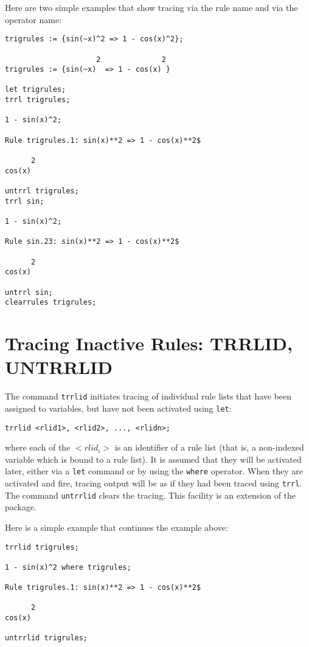 Here are two simple examples that show tracing via the rule name and
via the operator name:
\begin{verbatim}
trigrules := {sin(~x)^2 => 1 - cos(x)^2};

                     2              2
trigrules := {sin(~x)  => 1 - cos(x) }

let trigrules;
trrl trigrules;

1 - sin(x)^2;

Rule trigrules.1: sin(x)**2 => 1 - cos(x)**2$

      2
cos(x)

untrrl trigrules;
trrl sin;

1 - sin(x)^2;

Rule sin.23: sin(x)**2 => 1 - cos(x)**2$

      2
cos(x)

untrrl sin;
clearrules trigrules;
\end{verbatim}

\section{Tracing Inactive Rules: TRRLID, UNTRRLID}

\hypertarget{command:TRRLID}{}
\hypertarget{command:UNTRRLID}{}
The command \texttt{trrlid} initiates tracing of individual rule lists
that have been assigned to variables, but have not been activated
using \texttt{let}:
\begin{verbatim}
trrlid <rlid1>, <rlid2>, ..., <rlidn>;
\end{verbatim}
where each of the $<rlid_i>$ is an identifier of a rule list (that is,
a non-indexed variable which is bound to a rule list).  It is assumed
that they will be activated later, either via a \texttt{let} command
or by using the \texttt{where} operator.  When they are activated and
fire, tracing output will be as if they had been traced using
\texttt{trrl}.  The command \texttt{untrrlid} clears the tracing.
This facility is an extension of the \rdebug{} package.

Here is a simple example that continues the example above:
\begin{verbatim}
trrlid trigrules;

1 - sin(x)^2 where trigrules;

Rule trigrules.1: sin(x)**2 => 1 - cos(x)**2$

      2
cos(x)

untrrlid trigrules;
\end{verbatim}

